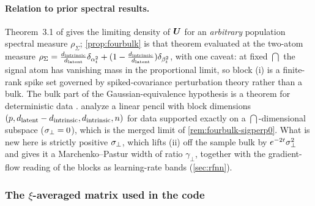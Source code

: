 \paragraph{Relation to prior spectral results.}
Theorem~3.1 of \citet{bonnaire2025} gives the limiting density of $\bm{U}$ for an \emph{arbitrary} population spectral measure $\rho_\Sigma$; \cref{prop:fourbulk} is that theorem evaluated at the two-atom measure $\rho_\Sigma=\tfrac{d_{\mathrm{intrinsic}}}{d_{\mathrm{latent}}}\delta_{\alpha_t^2}+(1-\tfrac{d_{\mathrm{intrinsic}}}{d_{\mathrm{latent}}})\delta_{\beta_t^2}$, with one caveat: at fixed $\dint$ the signal atom has vanishing mass in the proportional limit, so block (i) is a finite-rank spike set governed by spiked-covariance perturbation theory rather than a bulk. The bulk part of the Gaussian-equivalence hypothesis is a theorem for deterministic data \citep{louart2018random,liao2018spectrum,fanwang2020spectra}. \citet{george2025dsm} analyze a linear pencil with block dimensions $(p,d_{\mathrm{latent}}-d_{\mathrm{intrinsic}},d_{\mathrm{intrinsic}},n)$ for data supported exactly on a $\dint$-dimensional subspace ($\sigma_{\perp}=0$), which is the merged limit of \cref{rem:fourbulk-sigperp0}. What is new here is strictly positive $\sigma_{\perp}$, which lifts (ii) off the sample bulk by $e^{-2t}\sigma_{\perp}^2$ and gives it a Marchenko--Pastur width of ratio $\gamma_\perp$, together with the gradient-flow reading of the blocks as learning-rate bands (\cref{sec:rfnn}).

\subsubsection{The $\xi$-averaged matrix used in the code}

